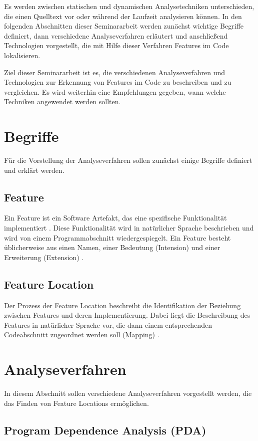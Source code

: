 \documentclass[runningheads,a4paper]{llncs}
\begin{document}
Es werden zwischen statischen und dynamischen Analysetechniken unterschieden, die einen Quelltext vor oder während der Laufzeit analysieren können. In den folgenden Abschnitten dieser Seminararbeit werden zunächst wichtige Begriffe definiert, dann verschiedene Analyseverfahren erläutert und anschließend Technologien vorgestellt, die mit Hilfe dieser Verfahren Features im Code lokalisieren.

Ziel dieser Seminararbeit ist es, die verschiedenen Analyseverfahren und Technologien zur Erkennung von Features im Code zu beschreiben und zu vergleichen. Es wird weiterhin eine Empfehlungen gegeben, wann welche Techniken angewendet werden sollten.

\section{Begriffe}

Für die Vorstellung der Analyseverfahren sollen zunächst einige Begriffe definiert und erklärt werden.

\subsection*{Feature}
Ein Feature ist ein Software Artefakt, das eine spezifische Funktionalität implementiert \cite{feature}. Diese Funktionalität wird in natürlicher Sprache beschrieben und wird von einem Programmabschnitt wiedergespiegelt. Ein Feature besteht üblicherweise aus einen Namen, einer Bedeutung (Intension) und einer Erweiterung (Extension) \cite{rajlich-chen}.

\subsection*{Feature Location}
Der Prozess der Feature Location beschreibt die Identifikation der Beziehung zwischen Features und deren Implementierung. Dabei liegt die Beschreibung des Features in natürlicher Sprache vor, die dann einem entsprechenden Codeabschnitt zugeordnet werden soll (Mapping) \cite{survey}.

\section{Analyseverfahren}

In diesem Abschnitt sollen verschiedene Analyseverfahren vorgestellt werden, die das Finden von Feature Locations ermöglichen.

\subsection*{Program Dependence Analysis (PDA)}\label{PDA}
\end{document}
